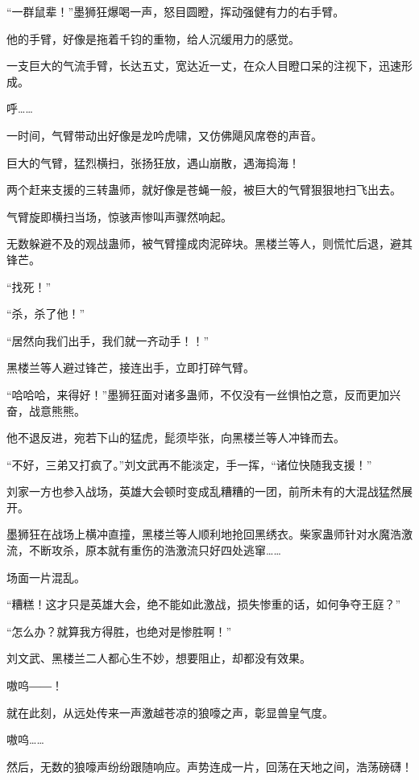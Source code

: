 \begin{this_body}
“一群鼠辈！”墨狮狂爆喝一声，怒目圆瞪，挥动强健有力的右手臂。

他的手臂，好像是拖着千钧的重物，给人沉缓用力的感觉。

一支巨大的气流手臂，长达五丈，宽达近一丈，在众人目瞪口呆的注视下，迅速形成。

呼……

一时间，气臂带动出好像是龙吟虎啸，又仿佛飓风席卷的声音。

巨大的气臂，猛烈横扫，张扬狂放，遇山崩散，遇海捣海！

两个赶来支援的三转蛊师，就好像是苍蝇一般，被巨大的气臂狠狠地扫飞出去。

气臂旋即横扫当场，惊骇声惨叫声骤然响起。

无数躲避不及的观战蛊师，被气臂撞成肉泥碎块。黑楼兰等人，则慌忙后退，避其锋芒。

“找死！”

“杀，杀了他！”

“居然向我们出手，我们就一齐动手！！”

黑楼兰等人避过锋芒，接连出手，立即打碎气臂。

“哈哈哈，来得好！”墨狮狂面对诸多蛊师，不仅没有一丝惧怕之意，反而更加兴奋，战意熊熊。

他不退反进，宛若下山的猛虎，髭须毕张，向黑楼兰等人冲锋而去。

“不好，三弟又打疯了。”刘文武再不能淡定，手一挥，“诸位快随我支援！”

刘家一方也参入战场，英雄大会顿时变成乱糟糟的一团，前所未有的大混战猛然展开。

墨狮狂在战场上横冲直撞，黑楼兰等人顺利地抢回黑绣衣。柴家蛊师针对水魔浩激流，不断攻杀，原本就有重伤的浩激流只好四处逃窜……

场面一片混乱。

“糟糕！这才只是英雄大会，绝不能如此激战，损失惨重的话，如何争夺王庭？”

“怎么办？就算我方得胜，也绝对是惨胜啊！”

刘文武、黑楼兰二人都心生不妙，想要阻止，却都没有效果。

嗷呜――！

就在此刻，从远处传来一声激越苍凉的狼嚎之声，彰显兽皇气度。

嗷呜……

然后，无数的狼嚎声纷纷跟随响应。声势连成一片，回荡在天地之间，浩荡磅礴！

\end{this_body}

